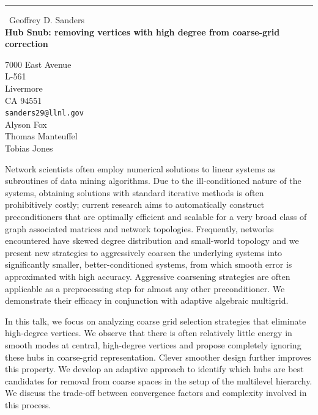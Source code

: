 \documentclass{report}
\begin{document}
\begin{center}
\rule{6in}{1pt} \
{\large Geoffrey D. Sanders \\
{\bf Hub Snub: removing vertices with high degree from coarse-grid correction}}

7000 East Avenue \\ L-561 \\ Livermore \\ CA 94551
\\
{\tt sanders29@llnl.gov}\\
Alyson Fox\\
Thomas Manteuffel\\
Tobias Jones\end{center}

Network scientists often employ numerical solutions to linear systems as
subroutines of data mining algorithms. Due to the ill-conditioned nature
of the systems, obtaining solutions with standard iterative methods is
often prohibitively costly; current research aims to automatically
construct preconditioners that are optimally efficient and scalable for a
very broad class of graph associated matrices and network topologies.
Frequently, networks encountered have skewed degree distribution and
small-world topology and we present new strategies to aggressively
coarsen the underlying systems into significantly smaller,
better-conditioned systems, from which smooth error is approximated with
high accuracy. Aggressive coarsening strategies are often applicable as a
preprocessing step for almost any other preconditioner. We demonstrate
their efficacy in conjunction with adaptive algebraic multigrid.

In this talk, we focus on analyzing coarse grid selection strategies that
eliminate high-degree vertices. We observe that there is often relatively
little energy in smooth modes at central, high-degree vertices and
propose completely ignoring these hubs in coarse-grid representation.
Clever smoother design further improves this property. We develop an
adaptive approach to identify which hubs are best candidates for removal
from coarse spaces in the setup of the multilevel hierarchy. We discuss
the trade-off between convergence factors and complexity involved in this
process.
\end{document}
